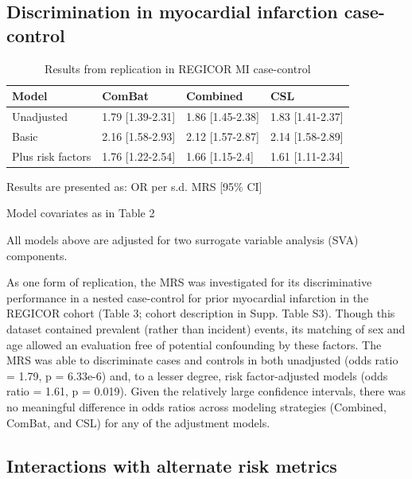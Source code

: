 \documentclass[]{article}
\begin{document}
\hypertarget{discrimination-in-myocardial-infarction-case-control}{%
\subsection{Discrimination in myocardial infarction
case-control}\label{discrimination-in-myocardial-infarction-case-control}}

\begin{table}[t]

\caption{\label{tab:regicor}Results from replication in REGICOR MI case-control}
\centering
\begin{threeparttable}
\begin{tabular}{llll}
\toprule
Model & ComBat & Combined & CSL\\
\midrule
Unadjusted & 1.79 [1.39-2.31] & 1.86 [1.45-2.38] & 1.83 [1.41-2.37]\\
Basic & 2.16 [1.58-2.93] & 2.12 [1.57-2.87] & 2.14 [1.58-2.89]\\
Plus risk factors & 1.76 [1.22-2.54] & 1.66 [1.15-2.4] & 1.61 [1.11-2.34]\\
\bottomrule
\end{tabular}
\begin{tablenotes}
\item * Results are presented as: OR per s.d. MRS [95\% CI]
\item * Model covariates as in Table 2
\item * All models above are adjusted for two surrogate variable analysis (SVA) components.
\end{tablenotes}
\end{threeparttable}
\end{table}

As one form of replication, the MRS was investigated for its
discriminative performance in a nested case-control for prior myocardial
infarction in the REGICOR cohort (Table 3; cohort description in Supp.
Table S3). Though this dataset contained prevalent (rather than
incident) events, its matching of sex and age allowed an evaluation free
of potential confounding by these factors. The MRS was able to
discriminate cases and controls in both unadjusted (odds ratio = 1.79, p
= 6.33e-6) and, to a lesser degree, risk factor-adjusted models (odds
ratio = 1.61, p = 0.019). Given the relatively large confidence
intervals, there was no meaningful difference in odds ratios across
modeling strategies (Combined, ComBat, and CSL) for any of the
adjustment models.

\hypertarget{interactions-with-alternate-risk-metrics}{%
\subsection{Interactions with alternate risk
metrics}\label{interactions-with-alternate-risk-metrics}}
\end{document}
